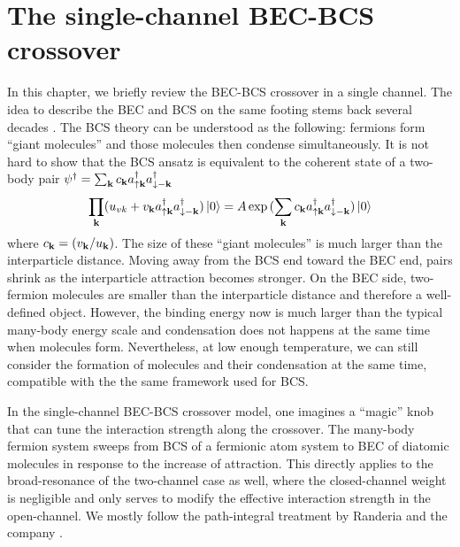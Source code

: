 \chapter{The single-channel BEC-BCS crossover\label{sec:intro:1channel}}
In this chapter, we briefly review the BEC-BCS crossover in a single channel.   The idea to describe the BEC and BCS on the same footing stems back several decades \cite{Eagle, LeggettCrossover, Nozieres, RanderiaBEC}.  %
The BCS theory can be understood as the following: fermions form  ``giant molecules'' and those molecules then condense simultaneously.    It is not hard to show that the  BCS ansatz is equivalent to  the  coherent state of a two-body pair $\psi^{\dagger}=\sum_{\mathbf{k}}c_{\mathbf{k}}a^{\dagger}_{\uparrow\mathbf{k}}a^{\dagger}_{\downarrow-\mathbf{k}}$
\begin{equation}\label{eq:intro:BCScoherent}
\prod_{\mathbf{k}}(u_{vk}+v_{\mathbf{k}}a^{\dagger}_{\uparrow\mathbf{k}}a^{\dagger}_{\downarrow-\mathbf{k}})\left|0\right>=A\exp{}(\sum_{\mathbf{k}}c_{\mathbf{k}}a^{\dagger}_{\uparrow\mathbf{k}}a^{\dagger}_{\downarrow-\mathbf{k}})\left|0\right>
\end{equation}
where $c_{\mathbf{k}}=( v_{\mathbf{k}}/u_{\mathbf{k}})$. The size of these ``giant molecules'' is  much larger than the interparticle distance.
Moving away from the BCS end toward the BEC end, pairs shrink as the interparticle attraction becomes stronger.  On the BEC side, two-fermion molecules are smaller than the interparticle distance and therefore a well-defined object. However, the binding energy now is much larger than the typical many-body energy scale and condensation does not happens at the same time when molecules form.  Nevertheless,  at low enough temperature, we can still consider the formation of molecules and their condensation  at the same time, compatible with the  the same framework used for BCS.  

In the single-channel BEC-BCS crossover model, one imagines a ``magic'' knob that can tune the interaction strength along the crossover.  The many-body fermion  system sweeps from  BCS of a fermionic atom system to BEC of diatomic molecules  in response to the increase of attraction.   This directly applies to the broad-resonance of the two-channel case as well, where the closed-channel weight is negligible and only serves  to modify the effective interaction strength in the open-channel.  We mostly follow the path-integral treatment by Randeria and the company \cite{RanderiaBEC, Randeria1997, Randeria2008}.




\begin{subappendices}
\end{subappendices}

